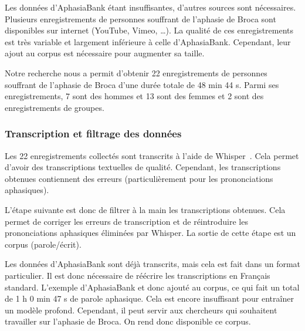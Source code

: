 Les données d'AphasiaBank étant insuffisantes, d'autres sources sont nécessaires.
Plusieurs enregistrements de personnes souffrant de l'aphasie de Broca sont disponibles sur internet 
(YouTube, Vimeo, \dots ).
La qualité de ces enregistrements est très variable et largement inférieure à celle d'AphasiaBank.
Cependant, leur ajout au corpus est nécessaire pour augmenter sa taille.

Notre recherche nous a permit d'obtenir 22 enregistrements de personnes souffrant de l'aphasie de Broca 
d'une durée totale de 48 min 44 s.
Parmi ses enregistrements, 7 sont des hommes et 13 sont des femmes et 2 sont des enregistrements de groupes.

\subsubsection{Transcription et filtrage des données}

Les 22 enregistrements collectés sont transcrits à l'aide de 
Whisper~\cite{Radford_Kim_Xu_Brockman_McLeavey_Sutskever_2022}.
Cela permet d'avoir des transcriptions textuelles de qualité.
Cependant, les transcriptions obtenues contiennent des erreurs (particulièrement pour les prononciations aphasiques).

L'étape suivante est donc de filtrer à la main les transcriptions obtenues.
Cela permet de corriger les erreurs de transcription 
et de réintroduire les prononciations aphasiques éliminées par Whisper.
La sortie de cette étape est un corpus (parole/écrit).

Les données d'AphasiaBank sont déjà transcrits, mais cela est fait dans un format particulier.
Il est donc nécessaire de réécrire les transcriptions en Français standard.
L'exemple d'AphasiaBank et donc ajouté au corpus, ce qui fait un total de 1 h 0 min 47 s de parole aphasique.
Cela est encore insuffisant pour entraîner un modèle profond.
Cependant, il peut servir aux chercheurs qui souhaitent travailler sur l'aphasie de Broca.
On rend donc disponible ce corpus.


